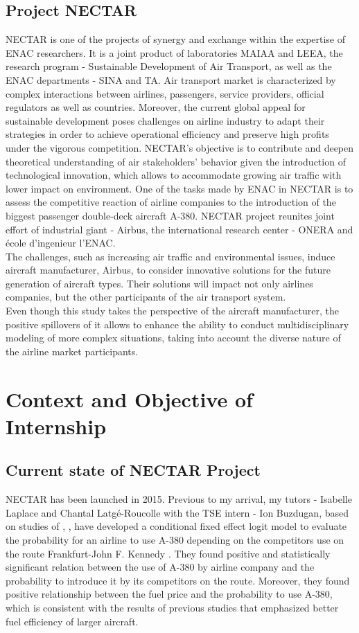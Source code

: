 \documentclass[titlepage, 11pt]{article}
\begin{document}
\subsection{Project NECTAR}\label{NECTAR}
\tab NECTAR is one of the projects of synergy and exchange within the expertise of ENAC researchers. It is a joint product of laboratories MAIAA and LEEA, the research program - Sustainable Development of Air Transport, as well as the ENAC departments - SINA and TA. Air transport market is characterized by complex interactions between airlines, passengers, service providers, official regulators as well as countries. Moreover, the current global appeal for sustainable development poses challenges on airline industry to adapt their strategies in order to achieve operational efficiency and preserve high profits under the vigorous competition. NECTAR's objective is to contribute and deepen theoretical understanding of air stakeholders' behavior given the introduction of technological innovation, which allows to accommodate growing air traffic with lower impact on environment. One of the tasks made by ENAC in NECTAR is to assess the competitive reaction of airline companies to the introduction of the biggest passenger double-deck aircraft A-380. NECTAR project reunites joint effort of industrial giant - Airbus, the international research center - ONERA and école d'ingenieur l'ENAC.\\  
\tab The challenges, such as increasing air traffic and environmental issues, induce aircraft manufacturer, Airbus, to consider innovative solutions for the future generation of aircraft types. Their solutions will impact not only airlines companies, but the other participants of the air transport system. \\
\tab Even though this study takes the perspective of the aircraft manufacturer, the positive spillovers of it allows to enhance the ability to conduct multidisciplinary modeling of more complex situations, taking into account the diverse nature of the airline market participants. 
\section{Context and Objective of Internship}
\subsection{Current state of NECTAR Project} \label{Current Nectar}
\tab NECTAR has been launched in 2015. Previous to my arrival, my tutors - Isabelle Laplace and Chantal Latgé-Roucolle with the TSE intern - Ion Buzdugan, based on studies of \citeauthor{Givoni1} \cite{Givoni1} \cite{Givoni2}, \citeauthor{Pitfield} \cite{Pitfield}, have developed a conditional fixed effect logit model to evaluate the probability for an airline to use A-380 depending on the competitors use on the route Frankfurt-John F. Kennedy \cite{key}. They found positive and statistically significant relation  between the use of A-380 by airline company and the probability to introduce it by its competitors on the route. Moreover, they found positive relationship between the fuel price and the probability to use A-380, which is consistent with the results of previous studies that emphasized better fuel efficiency of larger aircraft.  
\end{document}

